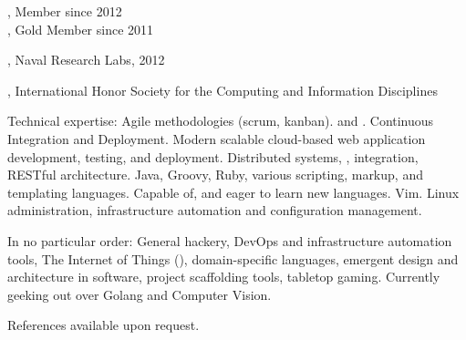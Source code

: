 \documentclass[10pt,a4paper]{article}
\begin{document}
\vspace{0.5em}
\spacedhrule{0.5em}{-0.4em}



\noindent{}, Member since 2012 \\
\noindent{}, Gold Member since 2011 \\
\vspace{0.5em}
\spacedhrule{0.5em}{-0.4em}


, Naval Research Labs, 2012

\noindent{}, International Honor Society for the Computing and Information Disciplines
\vspace{0.5em}
\spacedhrule{0.5em}{-0.4em}


\inlineheadsection  %
  {Technical expertise:}
  {
    Agile methodologies (scrum, kanban).
     and .
    Continuous Integration and Deployment.
    Modern scalable cloud-based web application development, testing, and deployment.
    Distributed systems, , integration, RESTful architecture.
    Java, Groovy, Ruby, various scripting, markup, and templating languages.  Capable of, and eager to learn new languages.
    Vim. Linux administration, infrastructure automation and configuration management.
  }

\spacedhrule{1.6em}{-0.4em}

\inlineheadsection
  {In no particular order:}
  {
    General hackery, DevOps and infrastructure automation tools,
    The Internet of Things (),
    domain-specific languages,
    emergent design and architecture in software,
    project scaffolding tools,
    tabletop gaming.
    Currently geeking out over Golang and Computer Vision.
  }

\spacedhrule{1.6em}{-0.4em}

\vspace{1.0em}

\noindent References available upon request.
\end{document}
